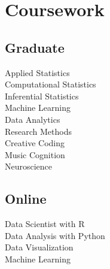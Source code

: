 \documentclass[]{deedy-resume-openfont}
\begin{document}
\begin{minipage}[t]{0.33\textwidth}
\section{Coursework}

\subsection{Graduate}
Applied Statistics \\
Computational Statistics \\
Inferential Statistics \\
Machine Learning \\
Data Analytics \\
Research Methods \\
Creative Coding \\
Music Cognition \\
Neuroscience
\sectionsep


\subsection{Online}
Data Scientist with R \\
Data Analysis with Python \\
Data Visualization \\
Machine Learning


\end{minipage} 
\hfill
\end{document}
